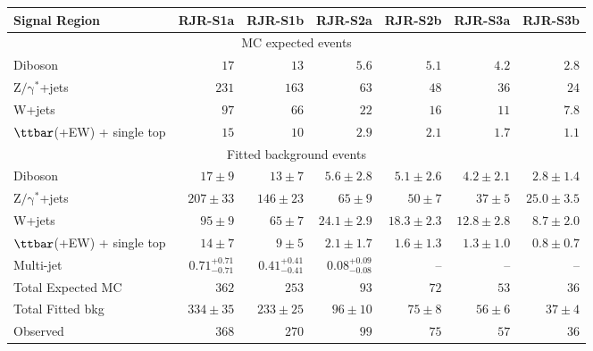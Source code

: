 \begin{table}[tbp]
\tiny
\begin{center}
\vspace*{-0.035\textwidth}
\begin{tabular}{|lrrrrrr|}
\hline
Signal Region & \textbf{ RJR-S1a } & \textbf{ RJR-S1b } & \textbf{ RJR-S2a } & \textbf{ RJR-S2b } & \textbf{ RJR-S3a } & \textbf{ RJR-S3b } \\
\hline
\multicolumn{7}{|c|}{MC expected events} \\ \hline
Diboson &  $17$               &  $13$               &  $5.6$               &  $5.1$               &  $4.2$               &  $2.8$               \\
$\mathrm{Z/\gamma^{*}}$+jets &  $231$               &  $163$               &  $63$               &  $48$               &  $36$               &  $24$               \\
W+jets &  $97$               &  $66$               &  $22$               &  $16$               &  $11$               &  $7.8$               \\
$\ttbar$(+EW) + single top &  $15$               &  $10$               &  $2.9$               &  $2.1$               &  $1.7$               &  $1.1$               \\
\hline
\multicolumn{7}{|c|}{Fitted background events} \\ \hline
Diboson & $17 \pm 9$ & $13 \pm 7$ & $5.6 \pm 2.8$ & $5.1 \pm 2.6$ & $4.2 \pm 2.1$ & $2.8 \pm 1.4$ \\
$\mathrm{Z/\gamma^{*}}$+jets & $207 \pm 33$ & $146 \pm 23$ & $65 \pm 9$ & $50 \pm 7$ & $37 \pm 5$ & $25.0 \pm 3.5$ \\
W+jets & $95 \pm 9$ & $65 \pm 7$ & $24.1 \pm 2.9$ & $18.3 \pm 2.3$ & $12.8 \pm 2.8$ & $8.7 \pm 2.0$ \\
$\ttbar$(+EW) + single top & $14 \pm 7$ & $9 \pm 5$ & $2.1 \pm 1.7$ & $1.6 \pm 1.3$ & $1.3 \pm 1.0$ & $0.8 \pm 0.7$ \\
Multi-jet &  $0.71_{-0.71}^{+0.71}$               &  $0.41_{-0.41}^{+0.41}$               &  $0.08_{-0.08}^{+0.09}$               & -- & -- & -- \\
\hline
Total Expected MC &  $362$               &  $253$               &  $93$               &  $72$               &  $53$               &  $36$               \\
\hline
Total Fitted bkg & $334 \pm 35$ & $233 \pm 25$ & $96 \pm 10$ & $75 \pm 8$ & $56 \pm 6$ & $37 \pm 4$ \\
\hline
Observed &  $368$                     &  $270$                     &  $99$                     &  $75$                     &  $57$                     &  $36$                     \\
\hline



\end{tabular}
\end{center}
\end{table}
